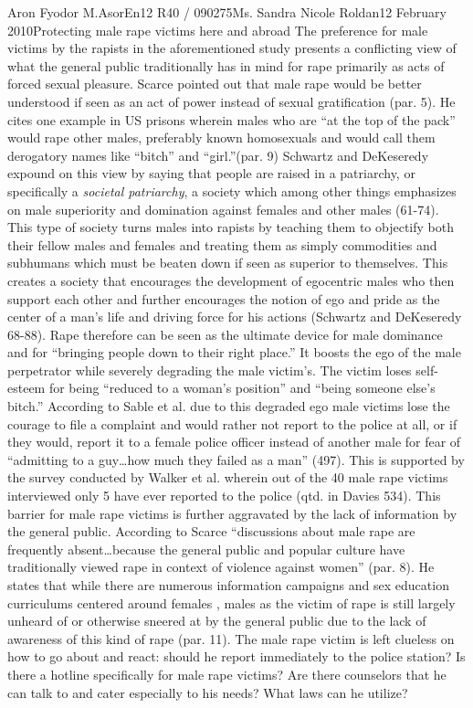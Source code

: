 \documentclass[12pt,letterpaper]{article}
\begin{document}
\begin{mla}{Aron Fyodor M.}{Asor}{En12 R40 / 090275}{Ms. Sandra Nicole Roldan}{12 February 2010}{Protecting male rape victims here and abroad}
%
%
The preference for male victims by the rapists in the aforementioned study presents a conflicting view of what the general public traditionally has in mind for rape primarily as acts of forced sexual pleasure. Scarce pointed out that male rape would be better understood if seen as an act of power instead of sexual gratification (par. 5). He cites one example in US prisons wherein males who are ``at the top of the pack'' would rape other males, preferably known homosexuals and would call them derogatory names like ``bitch'' and ``girl.''(par. 9) Schwartz and DeKeseredy expound on this view by saying that people are raised in a patriarchy, or specifically a \textit{societal patriarchy}, a society which among other things emphasizes on male superiority and domination against females and other males (61-74). This type of society turns males into rapists by teaching them to objectify both their fellow males and females and treating them as simply commodities and subhumans which must be beaten down if seen as superior to themselves. This creates a society that encourages the development of egocentric males who then support each other and further encourages the notion of ego and pride as the center of a man's life and driving force for his actions (Schwartz and DeKeseredy 68-88). Rape therefore can be seen as the ultimate device for male dominance and for ``bringing people down to their right place.'' It boosts the ego of the male perpetrator while severely degrading the male victim's. The victim loses self-esteem for being ``reduced to a woman's position'' and ``being someone else's bitch.'' According to Sable et al. due to this degraded ego male victims lose the courage to file a complaint and would rather not report to the police at all, or if they would, report it to a female police officer instead of another male for fear of ``admitting to a guy\ldots how much they failed as a man'' (497). This is supported by the survey conducted by Walker et al. wherein out of the 40 male rape victims interviewed only 5 have ever reported to the police (qtd. in Davies 534).
%
%
This barrier for male rape victims is further aggravated by the lack of information by the general public. According to Scarce ``discussions about male rape are frequently absent\ldots because the general public and popular culture have traditionally viewed rape in context of violence against women'' (par. 8). He states that while there are numerous information campaigns and sex education curriculums centered around females , males as the victim of rape is still largely unheard of or otherwise sneered at by the general public due to the lack of awareness of this kind of rape (par. 11). The male rape victim is left clueless on how to go about and react: should he report immediately to the police station? Is there a hotline specifically for male rape victims? Are there counselors that he can talk to and cater especially to his needs? What laws can he utilize?


\end{mla}
\end{document}
